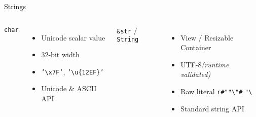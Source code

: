 \begin{frame}{Strings}%
	\begin{columns}[T]%
		\texttt{\Large char}%

		\begin{itemize}
			\item Unicode scalar value
			\item 32-bit width
			\item \texttt{'\textbackslash{}x7F'}, \texttt{'\textbackslash{}u\{12EF\}'}
			\item Unicode \& ASCII API
		\end{itemize}%

		{\Large \texttt{\&str} / \texttt{String}}%

		\begin{itemize}
			\item View / Resizable Container
			\item UTF-8\hfil\textit{\footnotesize (runtime validated)}
			\item Raw literal \texttt{r\#""\textbackslash{}"\#} \textrightarrow{} \texttt{"\textbackslash{}} %
			\item Standard string API
		\end{itemize}%
	\end{columns}%
\end{frame}
